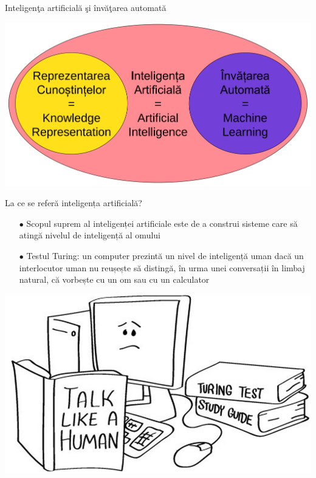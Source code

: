 \documentclass{beamer}
\begin{document}
\begin{frame}{Inteligenţa artificială şi învăţarea automată}
\begin{center}
	\includegraphics[scale=.21]{pic1.png}
\end{center}
\end{frame}

\begin{frame}{La ce se referă inteligența artificială?}
\begin{itemize}
	\item[$\bullet$] Scopul suprem al inteligenței artificiale este de a construi sisteme care să atingă nivelul de inteligență al omului
	\item[$\bullet$] Testul Turing: un computer prezintă un nivel de inteligență uman dacă un interlocutor uman nu reușește să distingă, în urma unei
conversații în limbaj natural, că vorbește cu un om sau cu un
calculator
\end{itemize}

\begin{center}
	\includegraphics[scale=.19]{pic2.png}
\end{center}
\end{frame}
\end{document}
